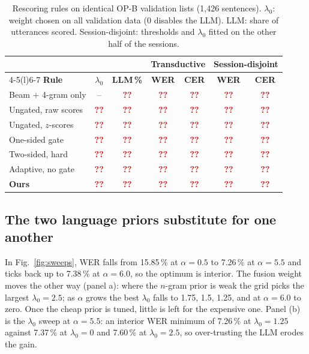 \documentclass[conference,a4paper,10pt]{IEEEtran}
\newcommand{\pct}{\,\%}
\newcommand{\RvPend}{\textcolor{red}{\textbf{??}}}
\newcommand{\RvBaseWER}{\RvPend}
\newcommand{\RvBaseCER}{\RvPend}
\newcommand{\RvBaseWERcv}{\RvPend}
\newcommand{\RvBaseCERcv}{\RvPend}
\newcommand{\RvBaseCalls}{\RvPend}
\newcommand{\RvUngRawWER}{\RvPend}
\newcommand{\RvUngRawCER}{\RvPend}
\newcommand{\RvUngRawWERcv}{\RvPend}
\newcommand{\RvUngRawCERcv}{\RvPend}
\newcommand{\RvUngRawCalls}{\RvPend}
\newcommand{\RvUngRawLam}{\RvPend}
\newcommand{\RvUngZWER}{\RvPend}
\newcommand{\RvUngZCER}{\RvPend}
\newcommand{\RvUngZWERcv}{\RvPend}
\newcommand{\RvUngZCERcv}{\RvPend}
\newcommand{\RvUngZCalls}{\RvPend}
\newcommand{\RvUngZLam}{\RvPend}
\newcommand{\RvOneSidedWER}{\RvPend}
\newcommand{\RvOneSidedCER}{\RvPend}
\newcommand{\RvOneSidedWERcv}{\RvPend}
\newcommand{\RvOneSidedCERcv}{\RvPend}
\newcommand{\RvOneSidedCalls}{\RvPend}
\newcommand{\RvOneSidedLam}{\RvPend}
\newcommand{\RvHardTwoWER}{\RvPend}
\newcommand{\RvHardTwoCER}{\RvPend}
\newcommand{\RvHardTwoWERcv}{\RvPend}
\newcommand{\RvHardTwoCERcv}{\RvPend}
\newcommand{\RvHardTwoCalls}{\RvPend}
\newcommand{\RvHardTwoLam}{\RvPend}
\newcommand{\RvAdaptNoGateWER}{\RvPend}
\newcommand{\RvAdaptNoGateCER}{\RvPend}
\newcommand{\RvAdaptNoGateWERcv}{\RvPend}
\newcommand{\RvAdaptNoGateCERcv}{\RvPend}
\newcommand{\RvAdaptNoGateCalls}{\RvPend}
\newcommand{\RvAdaptNoGateLam}{\RvPend}
\newcommand{\RvOursWER}{\RvPend}
\newcommand{\RvOursCER}{\RvPend}
\newcommand{\RvOursWERcv}{\RvPend}
\newcommand{\RvOursCERcv}{\RvPend}
\newcommand{\RvOursCalls}{\RvPend}
\newcommand{\RvOursLam}{\RvPend}
\begin{document}
\begin{table}[!t]
\centering
\caption{Rescoring rules on identical OP-B validation lists (1{,}426 sentences).
$\lambda_0$: weight chosen on all validation data ($0$ disables the LLM).
LLM: share of utterances scored. Session-disjoint: thresholds and $\lambda_0$ fitted on the other half
of the sessions.}
\label{tab:paired}
\footnotesize
\setlength{\tabcolsep}{3.2pt}
\begin{tabular}{@{}lcccccc@{}}
\toprule
 & & & \multicolumn{2}{c}{\textbf{Transductive}} & \multicolumn{2}{c}{\textbf{Session-disjoint}}\\
\cmidrule(lr){4-5}\cmidrule(l){6-7}
\textbf{Rule} & $\lambda_0$ & \textbf{LLM\,\%} & \textbf{WER} & \textbf{CER} & \textbf{WER} & \textbf{CER}\\
\midrule
Beam $+$ 4-gram only    & -- & \RvBaseCalls & \RvBaseWER & \RvBaseCER & \RvBaseWERcv & \RvBaseCERcv\\
Ungated, raw scores     & \RvUngRawLam & \RvUngRawCalls & \RvUngRawWER & \RvUngRawCER & \RvUngRawWERcv & \RvUngRawCERcv\\
Ungated, $z$-scores     & \RvUngZLam & \RvUngZCalls & \RvUngZWER & \RvUngZCER & \RvUngZWERcv & \RvUngZCERcv\\
One-sided gate          & \RvOneSidedLam & \RvOneSidedCalls & \RvOneSidedWER & \RvOneSidedCER & \RvOneSidedWERcv & \RvOneSidedCERcv\\
Two-sided, hard         & \RvHardTwoLam & \RvHardTwoCalls & \RvHardTwoWER & \RvHardTwoCER & \RvHardTwoWERcv & \RvHardTwoCERcv\\
Adaptive, no gate       & \RvAdaptNoGateLam & \RvAdaptNoGateCalls & \RvAdaptNoGateWER & \RvAdaptNoGateCER & \RvAdaptNoGateWERcv & \RvAdaptNoGateCERcv\\
\textbf{Ours}           & \RvOursLam & \RvOursCalls & \RvOursWER & \RvOursCER & \RvOursWERcv & \RvOursCERcv\\
\bottomrule
\end{tabular}
\end{table}

\subsection{The two language priors substitute for one another}\label{subsec:subst}
In Fig.~\ref{fig:sweeps}, WER falls from 15.85\pct{} at $\alpha=0.5$ to
7.26\pct{} at $\alpha=5.5$ and ticks back up to 7.38\pct{} at $\alpha=6.0$, so
the optimum is interior. The fusion weight moves the other way (panel a): where
the $n$-gram prior is weak the grid picks the largest $\lambda_0=2.5$; as
$\alpha$ grows the best $\lambda_0$ falls to 1.75, 1.5, 1.25, and at
$\alpha=6.0$ to zero. Once the cheap prior is tuned, little is left for the
expensive one. Panel (b)
is the $\lambda_0$ sweep at $\alpha=5.5$: an interior WER minimum of 7.26\pct{}
at $\lambda_0=1.25$ against 7.37\pct{} at $\lambda_0=0$ and 7.60\pct{} at
$\lambda_0=2.5$, so over-trusting the LLM erodes the gain.
\end{document}
